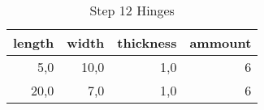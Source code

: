 \begin{table}[h!]
\centering
\caption{Step 12 Hinges}
\begin{tabular}{rrrr}
\toprule
 length &  width &  thickness &  ammount \\
\midrule
    5,0 &   10,0 &        1,0 &        6 \\
   20,0 &    7,0 &        1,0 &        6 \\
\bottomrule
\end{tabular}
\end{table}
